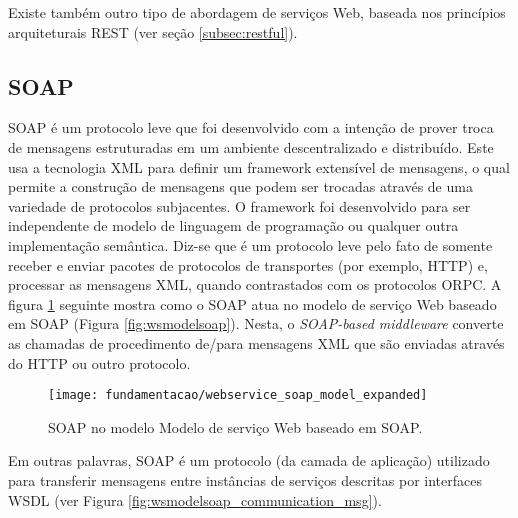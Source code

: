 Existe também outro tipo de abordagem de serviços Web, baseada nos princípios arquiteturais REST (ver seção \ref{subsec:restful}).

\subsection{SOAP}
\label{subsec:soap}
SOAP é um protocolo leve que foi desenvolvido com a intenção de prover troca de mensagens estruturadas em um ambiente descentralizado e distribuído. Este usa a tecnologia XML para definir um framework extensível de mensagens, o qual permite a construção de mensagens que podem ser trocadas através de uma variedade de protocolos subjacentes. O framework foi desenvolvido para ser independente de modelo de linguagem de programação ou qualquer outra implementação semântica\cite{w3c:soap}. Diz-se que é um protocolo leve pelo fato de somente receber e enviar pacotes de protocolos de transportes (por exemplo, HTTP) e, processar as mensagens XML, quando contrastados com os protocolos ORPC\cite{Papazoglou_slides:2008}. A figura \ref{fig:wsmodelsoap_expanded} seguinte mostra como o SOAP atua no modelo de serviço Web baseado em SOAP (Figura \ref{fig:wsmodelsoap}). Nesta, o \textit{SOAP-based middleware} converte as chamadas de procedimento de/para mensagens XML que são enviadas através do HTTP ou outro protocolo.

\begin{figure}[!htb] \centering 
  \centering
  \texttt{[image: fundamentacao/webservice\_soap\_model\_expanded]} 
  \caption{SOAP no modelo Modelo de serviço Web baseado em SOAP.\cite{Papazoglou_slides:2008}} 
  \label{fig:wsmodelsoap_expanded}
\end{figure}

Em outras palavras, SOAP é um protocolo (da camada de aplicação) utilizado para transferir mensagens entre instâncias de serviços descritas por interfaces WSDL (ver Figura \ref{fig:wsmodelsoap_communication_msg}).

